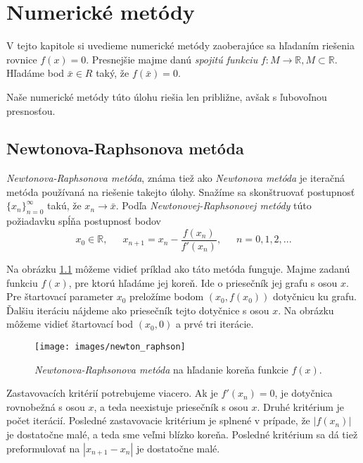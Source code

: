 
\chapter{Numerické metódy}
\label{kap:numeric_methods}

V tejto kapitole si uvedieme numerické metódy zaoberajúce sa hľadaním riešenia rovnice $f(x) = 0$.
Presnejšie majme danú \textit{spojitú funkciu} $f: M \to \mathbb{R}, M \subset \mathbb{R}$. Hľadáme bod
$\bar{x} \in R$ taký, že $f(\bar{x}) = 0$.

Naše numerické metódy túto úlohu riešia len približne, avšak s ľubovoľnou presnosťou.

\section{Newtonova-Raphsonova metóda}

\textit{Newtonova-Raphsonova metóda}, známa tiež ako \textit{Newtonova metóda} je iteračná metóda používaná na riešenie
takejto úlohy. Snažíme sa skonštruovať postupnosť $\{x_n\}_{n=0}^\infty$ takú, že $x_n \to \bar{x}$.
Podľa \textit{Newtonovej-Raphsonovej metódy} túto požiadavku spĺňa postupnosť bodov
$$x_0 \in \mathbb{R}, \,\,\,\,\,\,\,\,\, x_{n+1} = x_n - \frac{f(x_n)}{f'(x_n)}, \,\,\,\,\,\,\,\,\, n = 0, 1, 2, ...$$

Na obrázku \ref{obr:newton_raphson} môžeme vidieť príklad ako táto metóda funguje. Majme zadanú funkciu
$f(x)$, pre ktorú hľadáme jej koreň. Ide o priesečník jej grafu s osou $x$. Pre štartovací parameter
$x_0$ preložíme bodom $(x_0, f(x_0))$ dotyčnicu ku grafu. Ďalšiu iteráciu nájdeme ako priesečník tejto 
dotyčnice s osou $x$. Na obrázku môžeme vidieť štartovací bod $(x_0, 0)$ a prvé tri iterácie.

\begin{figure}
    \centerline{\texttt{[image: images/newton\_raphson]}}
    \caption[Newtonova-Raphsonova metóda]{\textit{Newtonova-Raphsonova metóda} na hľadanie koreňa funkcie $f(x)$.}
    \label{obr:newton_raphson}
\end{figure}

Zastavovacích kritérií potrebujeme viacero. Ak je $f'(x_n) = 0$, je dotyčnica rovnobežná
s osou $x$, a teda neexistuje priesečník s osou $x$. Druhé kritérium je počet iterácií. 
Posledné zastavovacie kritérium je splnené v prípade, že $|f(x_n)|$ je dostatočne 
malé, a teda sme veľmi blízko koreňa. Posledné kritérium sa dá tiež preformulovať na $|x_{n+1} - x_n|$ 
je dostatočne malé.

